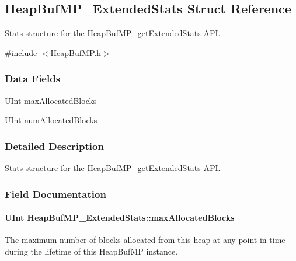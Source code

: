\subsection{Heap\-Buf\-M\-P\-\_\-\-Extended\-Stats Struct Reference}
\label{struct_heap_buf_m_p___extended_stats}


Stats structure for the Heap\-Buf\-M\-P\-\_\-get\-Extended\-Stats A\-P\-I.  




{\ttfamily \#include $<$Heap\-Buf\-M\-P.\-h$>$}

\subsubsection*{Data Fields}
\begin{DoxyCompactItemize}
\item 
U\-Int \hyperlink{struct_heap_buf_m_p___extended_stats_a94d85b9a5a7632bfa0d0962917055df1}{max\-Allocated\-Blocks}
\item 
U\-Int \hyperlink{struct_heap_buf_m_p___extended_stats_a757dc392845103b1e5b31ab02d17bef5}{num\-Allocated\-Blocks}
\end{DoxyCompactItemize}


\subsubsection{Detailed Description}
Stats structure for the Heap\-Buf\-M\-P\-\_\-get\-Extended\-Stats A\-P\-I. 

\subsubsection{Field Documentation}
\paragraph[{max\-Allocated\-Blocks}]{\setlength{\rightskip}{0pt plus 5cm}U\-Int Heap\-Buf\-M\-P\-\_\-\-Extended\-Stats\-::max\-Allocated\-Blocks}\label{struct_heap_buf_m_p___extended_stats_a94d85b9a5a7632bfa0d0962917055df1}
The maximum number of blocks allocated from this heap at any point in time during the lifetime of this Heap\-Buf\-M\-P instance. 
